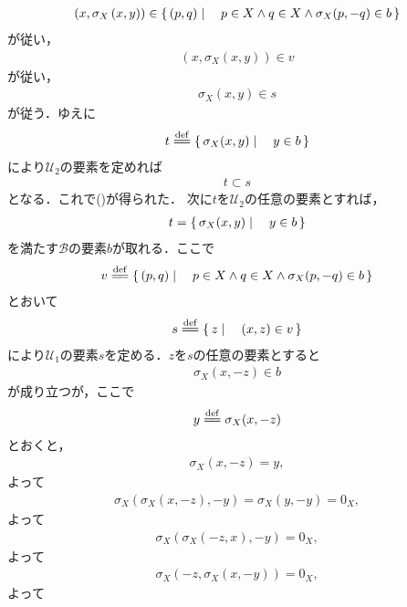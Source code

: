 \begin{sketch}
\begin{align}
			\left(x,\sigma_X\left(x,y\right)\right) \in \left\{\, (p,q) \mid \quad p \in X \wedge q \in X \wedge \sigma_X(p,-q) \in b\, \right\}
		\end{align}
		が従い，
		\begin{align}
			\left(x,\sigma_X\left(x,y\right)\right) \in v
		\end{align}
		が従い，
		\begin{align}
			\sigma_X\left(x,y\right) \in s
		\end{align}
		が従う．ゆえに
		\begin{align}
			t \defeq \Set{\sigma_X(x,y)}{y \in b}
		\end{align}
		により$\mathscr{U}_2$の要素を定めれば
		\begin{align}
			t \subset s
		\end{align}
		となる．これで()が得られた．
		次に$t$を$\mathscr{U}_2$の任意の要素とすれば，
		\begin{align}
			t = \left\{\, \sigma_X(x,y) \mid \quad y \in b\, \right\}
		\end{align}
		を満たす$\mathscr{B}$の要素$b$が取れる．ここで
		\begin{align}
			v \defeq \Set{(p,q)}{p \in X \wedge q \in X \wedge \sigma_X(p,-q) \in b}
		\end{align}
		とおいて
		\begin{align}
			s \defeq \Set{z}{(x,z) \in v}
		\end{align}
		により$\mathscr{U}_1$の要素$s$を定める．$z$を$s$の任意の要素とすると
		\begin{align}
			\sigma_X(x,-z) \in b
		\end{align}
		が成り立つが，ここで
		\begin{align}
			y \defeq \sigma_X(x,-z)
		\end{align}
		とおくと，
		\begin{align}
			\sigma_X(x,-z) = y,
		\end{align}
		よって
		\begin{align}
			\sigma_X\left(\sigma_X\left(x,-z\right),-y\right) = \sigma_X\left(y,-y\right) = 0_X,
		\end{align}
		よって
		\begin{align}
			\sigma_X\left(\sigma_X\left(-z,x\right),-y\right) = 0_X,
		\end{align}
		よって
		\begin{align}
			\sigma_X\left(-z,\sigma_X\left(x,-y\right)\right) = 0_X,
		\end{align}
		よって
		\begin{align}

\end{align}
\end{sketch}
